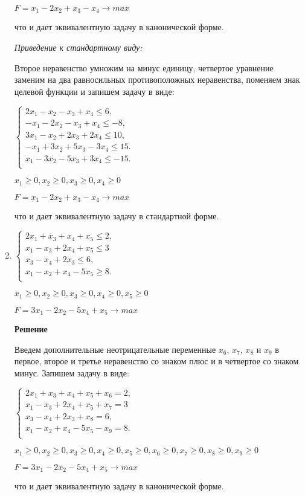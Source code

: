 \documentclass[12pt]{article}
\begin{document}
\begin{enumerate}
\begin{center}
$F=x_1-2x_2+ x_3-x_4  \rightarrow max$
\end{center}
что и дает эквивалентную задачу в канонической форме.

\textit{Приведение к стандартному виду:}

Второе неравенство умножим на минус единицу, четвертое уравнение заменим на два равносильных противоположных неравенства, поменяем знак целевой функции и запишем задачу в виде: 
\begin{center}

$\begin{cases}
  
  2x_1 -x_2-x_3+x_4 \le 6,\\ 
 -x_1 -2x_2-x_3+x_4\le -8,\\
 3x_1 -x_2 +2x_3+2x_4\le10,\\
  -x_1 +3x_2 +5x_3-3x_4\le15.\\
x_1 -3x_2 -5x_3+3x_4\le-15.\\

\end{cases}$

$x_1\ge0, x_2\ge0, x_3\ge0, x_4\ge0$

$F=x_1-2x_2+ x_3-x_4  \rightarrow max$
\end{center}
что и дает эквивалентную задачу в стандартной форме.
\newpage
\item
\begin{center}
$\begin{cases}
  2x_1 +x_3+x_4+x_5 \le 2,\\ 
 x_1 -x_3+2x_4+x_5 \le 3\\
 x_3 -x_4 +2x_3\le6,\\
  x_1 -x_2 +x_4-5x_5\ge8.\\
\end{cases}$

$x_1\ge0, x_2\ge0, x_3\ge0, x_4\ge0, x_5\ge0$

$F=3x_1-2x_2- 5x_4+x_5  \rightarrow max$


\end{center}

\textbf{Решение}


Введем дополнительные неотрицательные переменные $x_6$, $x_7$, $x_8$ и $ x_9$ в первое, второе и третье неравенство со знаком плюс и в четвертое со знаком минус. Запишем задачу в виде:
\begin{center}
$\begin{cases}
  2x_1 +x_3+x_4+x_5 + x_6= 2,\\ 
 x_1 -x_3+2x_4+x_5 + x_7=3\\
 x_3 -x_4 +2x_3+ x_8=6,\\
  x_1 -x_2 +x_4-5x_5- x_9=8.\\
\end{cases}$

$x_1\ge0, x_2\ge0, x_3\ge0, x_4\ge0, x_5\ge0, x_6\ge0, x_7\ge0, x_8\ge0, x_9\ge0$

$F=3x_1-2x_2- 5x_4+x_5  \rightarrow max$

\end{center}
что и дает эквивалентную задачу в канонической форме.

\end{enumerate}
\end{document}
